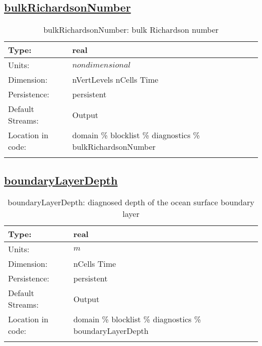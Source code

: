 \subsection[bulkRichardsonNumber]{\hyperref[sec:var_tab_diagnostics]{bulkRichardsonNumber}}
\label{subsec:var_sec_diagnostics_bulkRichardsonNumber}
\begin{center}
\begin{longtable}{| p{2.0in} | p{4.0in} |}
        \hline 
        Type: & real \\
        \hline 
        Units: & $nondimensional$ \\
        \hline 
        Dimension: & nVertLevels nCells Time \\
        \hline 
        Persistence: & persistent \\
        \hline 
		 Default Streams: & Output  \\
        \hline 
		 Location in code: & domain \% blocklist \% diagnostics \% bulkRichardsonNumber \\
		 \hline 
    \caption{bulkRichardsonNumber: bulk Richardson number}
\end{longtable}
\end{center}
\subsection[boundaryLayerDepth]{\hyperref[sec:var_tab_diagnostics]{boundaryLayerDepth}}
\label{subsec:var_sec_diagnostics_boundaryLayerDepth}
\begin{center}
\begin{longtable}{| p{2.0in} | p{4.0in} |}
        \hline 
        Type: & real \\
        \hline 
        Units: & $m$ \\
        \hline 
        Dimension: & nCells Time \\
        \hline 
        Persistence: & persistent \\
        \hline 
		 Default Streams: & Output  \\
        \hline 
		 Location in code: & domain \% blocklist \% diagnostics \% boundaryLayerDepth \\
		 \hline 
    \caption{boundaryLayerDepth: diagnosed depth of the ocean surface boundary layer}
\end{longtable}
\end{center}
